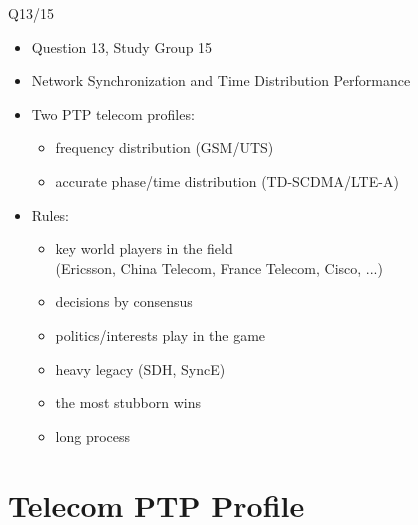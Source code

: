 \documentclass[compress,red]{beamer}
\begin{document}
\begin{frame}{Q13/15}

  \begin{itemize}
    \item Question 13, Study Group 15
    \item Network Synchronization and Time Distribution Performance
% 
    \item Two PTP telecom profiles:
	\begin{itemize}
	  \item frequency distribution (GSM/UTS) 

	  \item accurate phase/time distribution (TD-SCDMA/LTE-A) 

	\end{itemize}    
    \item Rules:
	\begin{itemize}
	  \item key world players in the field \\
		(Ericsson, China Telecom, France Telecom, Cisco, ...)
	  \item decisions by consensus
	  \item politics/interests play in the game
	  \item heavy legacy (SDH, SyncE)
	  \item the most stubborn wins
	  \item long process
	\end{itemize}


  \end{itemize}


\end{frame}
\section{Telecom PTP Profile}
\end{document}
